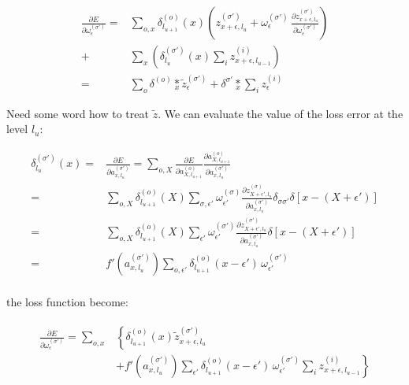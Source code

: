 \documentclass[final, paper=letter,5p,times,twocolumn]{elsarticle}
\begin{document}
\begin{equation*}  
\begin{split}
  \frac{\partial E}{\partial \omega_{\epsilon}^{(\sigma')}} = & \sum_{o,x} \delta_{l_{u+1}}^{(o)}(x)  \left( z_{x+\epsilon, l_{u}}^{(\sigma')} + \omega_{\epsilon}^{(\sigma')} \, \frac{\partial z_{x+\epsilon,l_{u}}^{(\sigma')}}{\partial \omega_{\epsilon}^{(\sigma')} } \right) \\
  + & \sum_{x} \left( \delta_{l_{u}}^{(\sigma')}(x)  \sum_{i}  z_{x+\epsilon, l_{u-1}}^{(i)} \right) \\
  = & \sum_{o} \delta^{(o)} \underset{x}{*} \tilde{z}_{\epsilon}^{(\sigma')} + \delta^{\sigma'} \underset{x}{*} \sum_{i} z_{\epsilon}^{(i)}
\end{split}
\end{equation*}

Need some word how to treat $\tilde{z}$. \lipsum[16-16] 
We can evaluate the value of the loss error at the level $l_{u}$:

\begin{equation*}  
\begin{split}
  \delta_{l_{u}}^{(\sigma')}(x) = & \frac{\partial E}{\partial a_{x,l_{u}}^{(\sigma')}} = \sum_{o,X} \frac{\partial E}{\partial a_{X,l_{u+1}}^{(o)}} \frac{\partial a_{X,l_{u+1}}^{(o)}}{\partial a_{x,l_{u}}^{(\sigma')}} \\
  = & \sum_{o,X} \delta_{l_{u+1}}^{(o)}(X) \sum_{\sigma,\epsilon'} \omega_{\epsilon'}^{(\sigma)} \frac{\partial z_{X + \epsilon', l_{u}}^{(\sigma)}}{\partial a_{x,l_{u}}^{(\sigma')}} \delta_{\sigma \sigma'}\delta[x-(X+\epsilon')] \\
  = & \sum_{o,X} \delta_{l_{u+1}}^{(o)}(X) \sum_{\epsilon'} \omega_{\epsilon'}^{(\sigma')} \frac{\partial z_{X + \epsilon', l_{u}}^{(\sigma')}}{\partial a_{x,l_{u}}^{(\sigma')}} \delta[x-(X+\epsilon')] \\
  = & f'(a_{x,l_{u}}^{(\sigma')}) \sum_{o,\epsilon'} \delta_{l_{u+1}}^{(o)}(x-\epsilon') \, \omega_{\epsilon'}^{(\sigma')}  \\
\end{split}
\end{equation*}

the loss function become:

\begin{eqnarray*}  
\begin{array}{rl}
  \frac{\partial E}{\partial \omega_{\epsilon}^{(\sigma')}} = \sum_{o,x} & \left\{ \delta_{l_{u+1}}^{(o)}(x) \tilde{z}_{x+\epsilon, l_{u}}^{(\sigma')} \right. \\
  & +  \left. f'(a_{x,l_{u}}^{(\sigma')}) \sum_{\epsilon'} \delta_{l_{u+1}}^{(o)}(x-\epsilon') \, \omega_{\epsilon'}^{(\sigma')} \sum_{i}  z_{x+\epsilon, l_{u-1}}^{(i)} \right\}
\end{array}
\end{eqnarray*}
\end{document}
